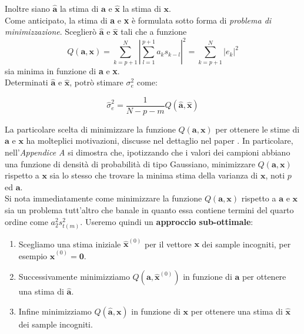 \documentclass{article}
\newcommand{\abs}[1]{\left|#1\right|}
\begin{document}
Inoltre siano $\mathbf{\hat{a}}$ la stima di $\mathbf{a}$ e $\mathbf{\hat{x}}$ la stima di $\mathbf{x}$. 
\\
Come anticipato, la stima di \textbf{a} e \textbf{x} è formulata sotto forma di \emph{problema di minimizzazione}. Sceglierò $\mathbf{\hat{a}}$ e $\mathbf{\hat{x}}$ tali che
a funzione 
\begin{equation}
Q(\mathbf{a},\mathbf{x}) = \sum_{k=p+1}^N \abs{\sum_{l=1}^{p+1} a_{k}s_{k-l}}^{2} 
= \sum_{k=p+1}^N \abs{e_{k}}^{2}
\end{equation}
sia minima in funzione di \textbf{a} e \textbf{x}. 
\\Determinati $\mathbf{\hat{a}}$ e $\mathbf{\hat{x}}$, potrò stimare $\sigma_{e}^{2}$ come:

\begin{equation} \label{ii5}
\hat{\sigma}_{e}^{2} = \frac{1}{N-p-m} Q(\mathbf{\hat{a}} , \mathbf{\hat{x}})
\end{equation}
	
La particolare scelta di minimizzare la funzione $Q(\mathbf{a},\mathbf{x})$ per ottenere le stime di $\mathbf{a}$ e $\mathbf{x}$ ha molteplici motivazioni, discusse nel dettaglio nel paper \cite{paper_1986}. In particolare, nell'\textit{Appendice A} si dimostra che, ipotizzando che i valori dei campioni abbiano una funzione di densità di probabilità di tipo Gaussiano, minimizzare $Q(\mathbf{a},\mathbf{x})$ rispetto a $\mathbf{x}$ sia lo stesso che trovare la minima stima della varianza di $\mathbf{x}$, noti $p$ ed $\mathbf{a}$.
\medskip 
\\
Si nota immediatamente come minimizzare la funzione $Q(\mathbf{a},\mathbf{x})$ rispetto a $\mathbf{a}$ e $\mathbf{x}$ sia un problema tutt'altro che banale in quanto essa contiene termini del quarto ordine come $a_{2}^{2}s_{t(m)}^{2}$. Useremo quindi un \textbf{approccio sub-ottimale}:

\begin{enumerate}
\item Scegliamo una stima iniziale $\mathbf{\hat{x}}^{(0)}$ per il vettore $\mathbf{x}$ dei sample incogniti, per esempio $\mathbf{\hat{x}}^{(0)} = \mathbf{0}$.
\item Successivamente minimizziamo $Q(\mathbf{a},\mathbf{\hat{x}}^{(0)})$ in funzione di $\mathbf{a}$ per ottenere una stima di $\mathbf{\hat{a}}$.
\item Infine minimizziamo $Q(\mathbf{\hat{a}},\mathbf{x})$ in funzione di $\mathbf{x}$ per ottenere una stima di $\mathbf{\hat{x}}$ dei sample incogniti. 
\end{enumerate}
\end{document}
